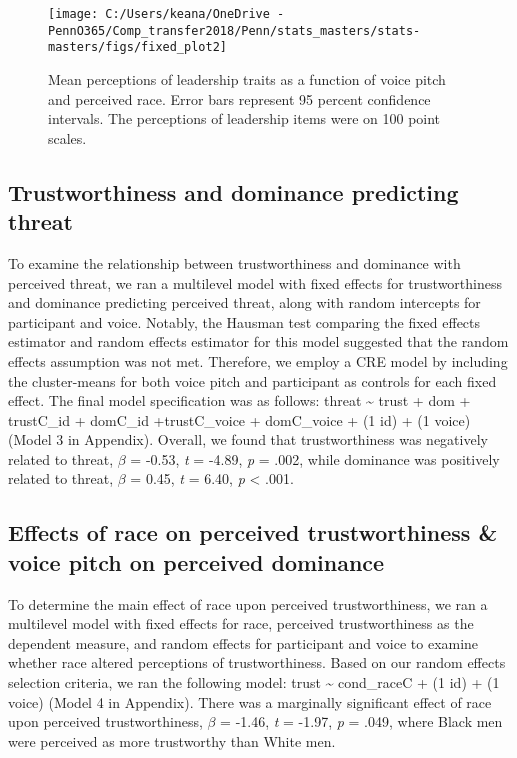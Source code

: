 \documentclass[
  english,
  man, noextraspace,floatsintext]{apa6}
\begin{document}
\begin{figure}

{\centering \texttt{[image: C:/Users/keana/OneDrive - PennO365/Comp\_transfer2018/Penn/stats\_masters/stats-masters/figs/fixed\_plot2]} 

}

\caption{Mean perceptions of leadership traits as a function of voice pitch and perceived race. Error bars represent 95 percent confidence intervals. The perceptions of leadership items were on 100 point scales.}\label{fig:f2}
\end{figure}

\hypertarget{trustworthiness-and-dominance-predicting-threat}{%
\subsection{Trustworthiness and dominance predicting threat}\label{trustworthiness-and-dominance-predicting-threat}}

To examine the relationship between trustworthiness and dominance with perceived threat, we ran a multilevel model with fixed effects for trustworthiness and dominance predicting perceived threat, along with random intercepts for participant and voice. Notably, the Hausman test comparing the fixed effects estimator and random effects estimator for this model suggested that the random effects assumption was not met. Therefore, we employ a CRE model by including the cluster-means for both voice pitch and participant as controls for each fixed effect. The final model specification was as follows: threat \textasciitilde{} trust + dom + trustC\_id + domC\_id +trustC\_voice + domC\_voice + (1 \textbar{} id) + (1 \textbar{} voice) (Model 3 in Appendix). Overall, we found that trustworthiness was negatively related to threat, \(\beta\) = -0.53, \emph{t} = -4.89, \emph{p} = .002, while dominance was positively related to threat, \(\beta\) = 0.45, \emph{t} = 6.40, \emph{p} \textless{} .001.

\hypertarget{effects-of-race-on-perceived-trustworthiness-voice-pitch-on-perceived-dominance}{%
\subsection{Effects of race on perceived trustworthiness \& voice pitch on perceived dominance}\label{effects-of-race-on-perceived-trustworthiness-voice-pitch-on-perceived-dominance}}

To determine the main effect of race upon perceived trustworthiness, we ran a multilevel model with fixed effects for race, perceived trustworthiness as the dependent measure, and random effects for participant and voice to examine whether race altered perceptions of trustworthiness. Based on our random effects selection criteria, we ran the following model: trust \textasciitilde{} cond\_raceC + (1 \textbar{} id) + (1 \textbar{} voice) (Model 4 in Appendix). There was a marginally significant effect of race upon perceived trustworthiness, \(\beta\) = -1.46, \emph{t} = -1.97, \emph{p} = .049, where Black men were perceived as more trustworthy than White men.
\end{document}
